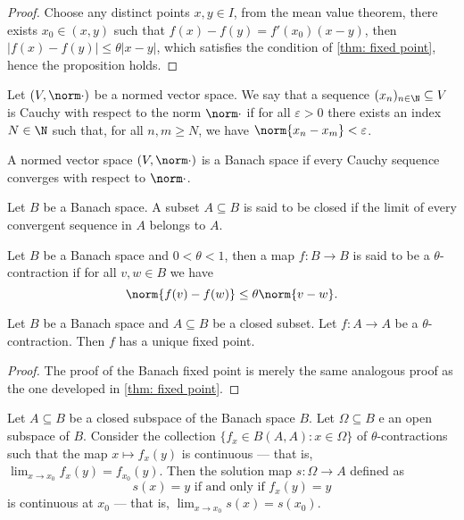 \begin{proof}
Choose any distinct points \(x, y \in I\), from the mean value theorem, there
exists \(x_0 \in (x, y)\) such that \(f(x) - f(y) = f'(x_0)(x - y)\), then
\(|f(x) - f(y)| \leq \theta |x - y|\), which satisfies the condition of
\cref{thm: fixed point}, hence the proposition holds.
\end{proof}

\begin{definition}
Let \((V, \norm \cdot)\) be a normed vector space. We say that a sequence
\((x_n)_{n \in \N} \subseteq V\) is Cauchy with respect to the norm \(\norm \cdot\) if for all
\(\varepsilon > 0\) there exists an index \(N \in \N\) such that, for all \(n, m \geq N\), we
have \(\norm{x_n - x_m} < \varepsilon\).
\end{definition}


\begin{definition}\label{def: Banach space}
A normed vector space \((V, \norm \cdot)\) is a Banach space if every Cauchy
sequence converges with respect to \(\norm \cdot\).
\end{definition}

\begin{definition}
Let \(B\) be a Banach space. A subset \(A \subseteq B\) is said to be closed
if the limit of every convergent sequence in \(A\) belongs to \(A\).
\end{definition}

\begin{definition}[Contraction]
\label{def:contraction}
Let \(B\) be a Banach space and \(0 < \theta < 1\), then a map \(f: B \to B\)
is said to be a \(\theta\)-contraction if for all \(v, w \in B\) we have
\[
\norm{f(v) - f(w)} \leq \theta \norm{v - w}.
\]
\end{definition}

\begin{theorem}\label{thm: Banach fixed point}
Let \(B\) be a Banach space and \(A \subseteq B\) be a closed subset. Let \(f:
A \to A\) be a \(\theta\)-contraction. Then \(f\) has a unique fixed point.
\end{theorem}

\begin{proof}
The proof of the Banach fixed point is merely the same analogous proof as the
one developed in \cref{thm: fixed point}.
\end{proof}

\begin{proposition}
\label{prop:fixed-point-stability}
Let \(A \subseteq B\) be a closed subspace of the Banach space \(B\). Let \(\Omega \subseteq B\) e
an open subspace of \(B\). Consider the collection \(\{f_{x} \in B(A, A) \colon x \in
\Omega\}\)   of \(\theta\)-contractions such that the map \(x \mapsto f_x(y)\) is continuous ---
that is, \(\lim_{x\to x_0} f_x(y) = f_{x_0}(y)\).
Then the solution map \(s: \Omega \to A\) defined as
\[
s(x) = y \text{ if and only if } f_x(y) = y
\]
is continuous at \(x_0\) --- that is, \(\lim_{x \to x_0} s(x) = s(x_0)\).
\end{proposition}

